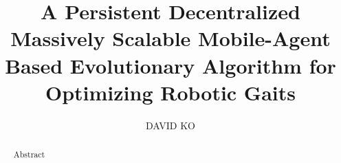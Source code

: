\documentclass[12pt,final]{style/ucthesis}
\begin{document}
\title{A Persistent Decentralized Massively Scalable Mobile-Agent Based Evolutionary Algorithm for Optimizing Robotic Gaits}
\author{DAVID KO}

\begin{frontmatter}

\maketitle
\begin{abstract}
Abstract
\end{abstract}
\tableofcontents
\listoffigures
\listoftables



\end{frontmatter}















%





\end{document}
